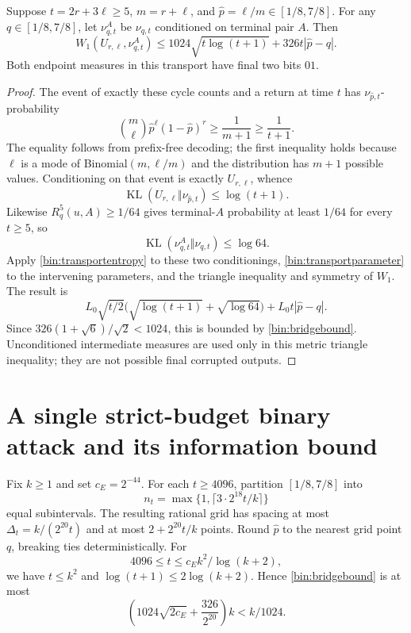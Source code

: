 \begin{lemma}
\label{bin:bridge}
Suppose $t=2r+3\ell\ge5$, $m=r+\ell$, and $\widehat p=\ell/m\in[1/8,7/8]$. For any $q\in[1/8,7/8]$, let $\nu^A_{q,t}$ be $\nu_{q,t}$ conditioned on terminal pair $A$. Then
\begin{equation}
 W_1(U_{r,\ell},\nu^A_{q,t})
 \le1024\sqrt{t\log(t+1)}+326t|\widehat p-q|.
 \label{bin:bridgebound}
\end{equation}
Both endpoint measures in this transport have final two bits $01$.
\end{lemma}
\begin{proof}
The event of exactly these cycle counts and a return at time $t$ has $\nu_{\widehat p,t}$-probability
\[
 \binom m\ell\widehat p^\ell(1-\widehat p)^r\ge\frac1{m+1}\ge\frac1{t+1}.
\]
The equality follows from prefix-free decoding; the first inequality holds because $\ell$ is a mode of Binomial$(m,\ell/m)$ and the distribution has $m+1$ possible values. Conditioning on that event is exactly $U_{r,\ell}$, whence
\[
 \operatorname{KL}(U_{r,\ell}\Vert\nu_{\widehat p,t})\le\log(t+1).
\]
Likewise $R_q^5(u,A)\ge1/64$ gives terminal-$A$ probability at least $1/64$ for every $t\ge5$, so
\[
 \operatorname{KL}(\nu^A_{q,t}\Vert\nu_{q,t})\le\log64.
\]
Apply \eqref{bin:transportentropy} to these two conditionings, \eqref{bin:transportparameter} to the intervening parameters, and the triangle inequality and symmetry of $W_1$. The result is
\[
 L_0\sqrt{t/2}\bigl(\sqrt{\log(t+1)}+\sqrt{\log64}\bigr)
      +L_0t|\widehat p-q|.
\]
Since $326(1+\sqrt6)/\sqrt2<1024$, this is bounded by \eqref{bin:bridgebound}. Unconditioned intermediate measures are used only in this metric triangle inequality; they are not possible final corrupted outputs.
\end{proof}

\section{A single strict-budget binary attack and its information bound}
\label{bin:attack}
Fix $k\ge1$ and set $c_E=2^{-44}$. For each $t\ge4096$, partition $[1/8,7/8]$ into
\[
 n_t=\max\{1,\lceil3\cdot2^{18}t/k\rceil\}
\]
equal subintervals. The resulting rational grid has spacing at most $\Delta_t=k/(2^{20}t)$ and at most $2+2^{20}t/k$ points. Round $\widehat p$ to the nearest grid point $q$, breaking ties deterministically. For
\begin{equation}
 4096\le t\le c_E k^2/\log(k+2),
 \label{bin:entropycutoff}
\end{equation}
we have $t\le k^2$ and $\log(t+1)\le2\log(k+2)$. Hence \eqref{bin:bridgebound} is at most
\begin{equation}
 \left(1024\sqrt{2c_E}+\frac{326}{2^{20}}\right)k
       <k/1024.
 \label{bin:costsmall}
\end{equation}

